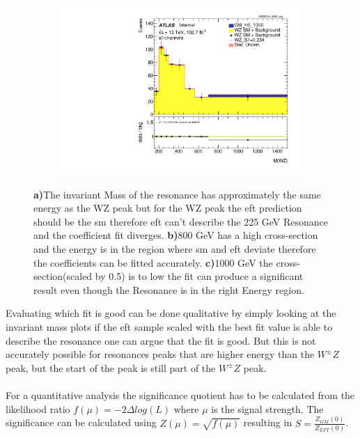\documentclass[../Bachelorarbeit.tex]{subfiles}
\begin{document}
\begin{figure}[h]
\begin{subfigure}{0.3\textwidth}
        \caption{}
    \end{subfigure}
    \begin{subfigure}{0.3\textwidth}
        \includegraphics[width=\textwidth]{Plots/05x_for_comparision/VBSSR/all_VV_MWZ_vbs.pdf}
        \caption{}
    \end{subfigure}
    \caption{\textbf{a)}The invariant Mass of the resonance has approximately the same energy as the WZ peak but for the WZ peak the \acrshort{eft} prediction
        should be the \acrshort{sm} therefore \acrshort{eft} can't describe the 225 GeV Resonance and the coefficient fit diverges.
        \textbf{b)}800 GeV has a high cross-section and the energy is in the region where \acrshort{sm} and \acrshort{eft} deviate therefore the coefficients can be fitted accurately.
        \textbf{c)}1000 GeV the cross-section(scaled by 0.5) is to low the fit can produce a significant result even though the Resonance is in the right Energy region.}
    \label{fig:S1_with_fit_diffrence_225}
\end{figure}
Evaluating which fit is good can be done qualitative by simply looking at the invariant mass plots if the \acrshort{eft} sample scaled with the best fit value is able to describe
the resonance one can argue that the fit is good. But this is not accurately possible for resonances peaks that are higher energy than the $W^{\pm}Z$ peak, but the start of the peak is still part of the $W^{\pm}Z$ peak.\\\\
For a quantitative analysis the significance quotient has to be calculated from the likelihood ratio $f(\mu)=-2\Delta log(L)$ where $\mu$ is the signal strength.
The significance can be calculated using $Z(\mu)=\sqrt{f(\mu)}$ resulting in $S = \frac{Z_{GM}(0)}{Z_{EFT}(0)}$.
\end{document}
